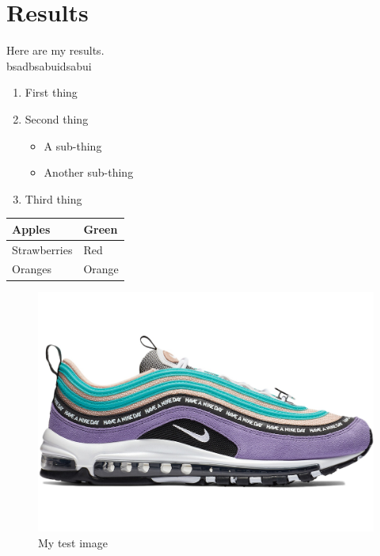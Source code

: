 \documentclass[a4paper,12pt]{article}
\begin{document}
 

\section{Results}
Here are my results. \\bsadbsabuidsabui
\begin{enumerate}
	\item First thing
	\item Second thing
		\begin{itemize}
		      \item A sub-thing
		      \item Another sub-thing
	    \end{itemize} %
	\item Third thing
\end{enumerate}
\begin{tabular}{|l|l|}
	\hline
	Apples & Green \\
	\hline
Strawberries & Red \\
Oranges & Orange \\
\end{tabular}
\begin{figure}[h!]
	\centering
	\includegraphics[width=1\textwidth]{airmax.jpg}
	\caption{My test image}
	\end{figure}
\end{document}

